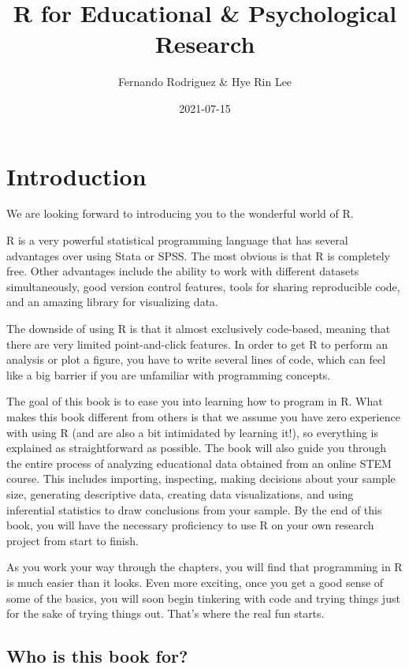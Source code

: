 \documentclass[
]{book}
\title{R for Educational \& Psychological Research}
\author{Fernando Rodriguez \& Hye Rin Lee}
\date{2021-07-15}
\begin{document}
\maketitle

{
\setcounter{tocdepth}{1}
\tableofcontents
}
\hypertarget{introduction}{%
\chapter{Introduction}\label{introduction}}

We are looking forward to introducing you to the wonderful world of R.

R is a very powerful statistical programming language that has several advantages over using Stata or SPSS. The most obvious is that R is completely free. Other advantages include the ability to work with different datasets simultaneously, good version control features, tools for sharing reproducible code, and an amazing library for visualizing data.

The downside of using R is that it almost exclusively code-based, meaning that there are very limited point-and-click features. In order to get R to perform an analysis or plot a figure, you have to write several lines of code, which can feel like a big barrier if you are unfamiliar with programming concepts.

The goal of this book is to ease you into learning how to program in R. What makes this book different from others is that we assume you have zero experience with using R (and are also a bit intimidated by learning it!), so everything is explained as straightforward as possible. The book will also guide you through the entire process of analyzing educational data obtained from an online STEM course. This includes importing, inspecting, making decisions about your sample size, generating descriptive data, creating data visualizations, and using inferential statistics to draw conclusions from your sample. By the end of this book, you will have the necessary proficiency to use R on your own research project from start to finish.

As you work your way through the chapters, you will find that programming in R is much easier than it looks. Even more exciting, once you get a good sense of some of the basics, you will soon begin tinkering with code and trying things just for the sake of trying things out. That's where the real fun starts.

\hypertarget{who-is-this-book-for}{%
\section{Who is this book for?}\label{who-is-this-book-for}}
\end{document}
